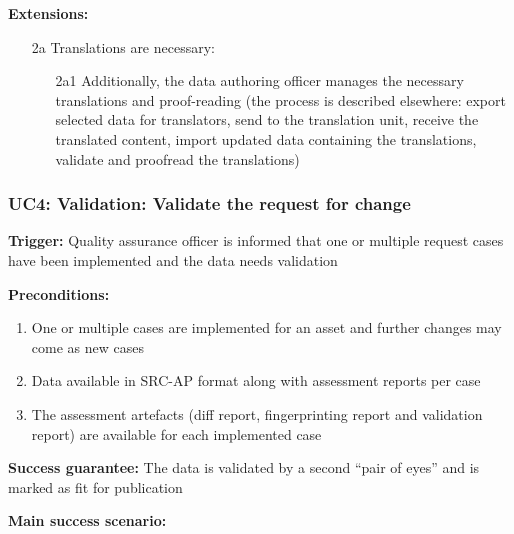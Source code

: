 	\textbf{Extensions:}
	\begin{enumerate}
		\item [2a] Translations are necessary:
		\begin{enumerate}
			\item [2a1] Additionally, the data authoring officer manages the necessary translations and proof-reading (the process is described elsewhere: export selected data for translators, send to the translation unit, receive the translated content, import updated data containing the translations, validate and proofread the translations)			
		\end{enumerate}
	\end{enumerate}
	
	\subsubsection{UC4: Validation: Validate the request for change}
	\label{sec:uc4}
	
	\textbf{Trigger:} Quality assurance officer is informed that one or multiple request cases have been implemented and the data needs validation 
	
	\textbf{Preconditions:} 
	\begin{enumerate}
	    \item One or multiple cases are implemented for an asset and further changes may come as new cases
	    \item Data available in SRC-AP \citep{src-ap-vb3} format along with assessment reports per case
	    \item The assessment artefacts (diff report, fingerprinting report and validation report) are available for each implemented case
	\end{enumerate}
	
	\textbf{Success guarantee:} The data is validated by a second ``pair of eyes'' and is marked as fit for publication
	
	\textbf{Main success scenario:} 
	
